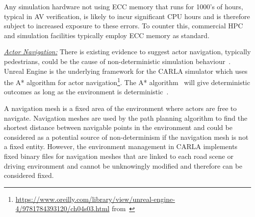\documentclass[letterpaper, 10 pt, journal, twoside]{IEEEtran}
\begin{document}
Any simulation hardware not using ECC memory that runs for 1000's of hours, typical in AV verification, is likely to incur significant CPU hours and is therefore subject to increased exposure to these errors. To counter this, commercial HPC and simulation facilities typically employ ECC memory as standard.



\noindent\underline{\textit{Actor Navigation:}}
There is existing evidence to suggest actor navigation, typically pedestrians, could be the cause of non-deterministic simulation behaviour~\cite{CARLABenchmark}.
% 
Unreal Engine is the underlying framework for the CARLA simulator which uses the A* algorithm for actor navigation\footnote{\url{https://www.oreilly.com/library/view/unreal-engine-4/9781784393120/ch04s03.html} from~\cite{newton2016unreal}}.
%
The A* algorithm~\cite{AStarBook} will give deterministic outcomes as long as the environment is deterministic~\cite{AirsimUnrealArticle, UnrealAIDocumentation}. 

A navigation mesh is a fixed area of the environment where actors are free to navigate.
%
Navigation meshes are used by the path planning algorithm to find the shortest distance between navigable points in the environment and could be considered as a potential source of non-determinism if the navigation mesh is not a fixed entity. %
%
However, the environment management in CARLA implements fixed binary files for navigation meshes that are linked to each road scene or driving environment and cannot be unknowingly modified and therefore can be considered fixed. 
\end{document}
